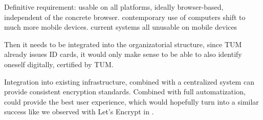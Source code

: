 Definitive requirement: usable on all platforms, ideally browser-based, independent of the concrete browser.
contemporary use of computers shift to much more mobile devices.
current systems all unusable on mobile devices

Then it needs to be integrated into the organizatorial structure, since TUM already issues ID cards, it would only make
sense to be able to also identify oneself digitally, certified by TUM\@.

Integration into existing infrastructure, combined with a centralized system can provide consistent encryption
standards.
Combined with full automatization, could provide the best user experience, which would hopefully turn into a similar
success like we observed with Let's Encrypt in .
